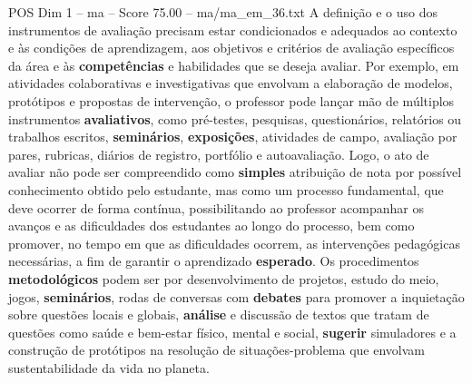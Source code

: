 \begin{textsample}{POS Dim 1 – ma – Score 75.00 – ma/ma\_em\_36.txt}
A definição e o uso dos instrumentos de avaliação precisam estar condicionados e adequados ao contexto e às condições de aprendizagem, aos objetivos e critérios de avaliação específicos da área e às \textbf{competências} e habilidades que se deseja avaliar.
Por exemplo, em atividades colaborativas e investigativas que envolvam a elaboração de modelos, protótipos e propostas de intervenção, o professor pode lançar mão de múltiplos instrumentos \textbf{avaliativos}, como pré-testes, pesquisas, questionários, relatórios ou trabalhos escritos, \textbf{seminários}, \textbf{exposições}, atividades de campo, avaliação por pares, rubricas, diários de registro, portfólio e autoavaliação.
Logo, o ato de avaliar não pode ser compreendido como \textbf{simples} atribuição de nota por possível conhecimento obtido pelo estudante, mas como um processo fundamental, que deve ocorrer de forma contínua, possibilitando ao professor acompanhar os avanços e as dificuldades dos estudantes ao longo do processo, bem como promover, no tempo em que as dificuldades ocorrem, as intervenções pedagógicas necessárias, a fim de garantir o aprendizado \textbf{esperado}.
Os procedimentos \textbf{metodológicos} podem ser por desenvolvimento de projetos, estudo do meio, jogos, \textbf{seminários}, rodas de conversas com \textbf{debates} para promover a inquietação sobre questões locais e globais, \textbf{análise} e discussão de textos que tratam de questões como saúde e bem-estar físico, mental e social, \textbf{sugerir} simuladores e a construção de protótipos na resolução de situações-problema que envolvam sustentabilidade da vida no planeta.

\end{textsample}
